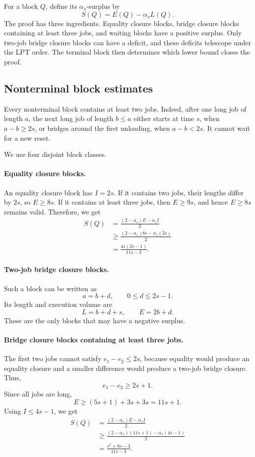 \documentclass[11pt]{article}
\begin{document}
For a block \(Q\), define its \(\alpha_s\)-surplus by
\[
S(Q)=E(Q)-\alpha_sL(Q).
\]
The proof has three ingredients. Equality closure blocks, bridge closure blocks
containing at least three jobs, and waiting blocks have a positive surplus. Only
two-job bridge closure blocks can have a deficit, and these deficits telescope
under the LPT order. The terminal block then determines which lower bound closes
the proof.

\subsection{Nonterminal block estimates}
\label{appsub:lpt-block-estimates}

Every nonterminal block contains at least two jobs. Indeed, after one long job
of length \(a\), the next long job of length \(b\le a\) either starts at time
\(s\), when \(a-b\ge2s\), or bridges around the first unloading, when
\(a-b<2s\). It cannot wait for a new reset.

We use four disjoint block classes.

\paragraph{Equality closure blocks.}
An equality closure block has \(I=2s\). If it contains two jobs, their lengths
differ by \(2s\), so \(E\ge8s\). If it contains at least three jobs, then
\(E\ge9s\), and hence \(E\ge8s\) remains valid. Therefore, we get 
\[
\begin{aligned}
S(Q)
&=\frac{(2-\alpha_s)E-\alpha_s I}{2}\\
&\ge
\frac{(2-\alpha_s)8s-\alpha_s(2s)}2\\
&=
\frac{4s(2s-1)}{11s-3}.
\end{aligned}
\tag{A.2}
\label{eq:lpt-equality-surplus}
\]

\paragraph{Two-job bridge closure blocks.}
Such a block can be written as
\[
a=b+d,
\qquad
0\le d\le2s-1.
\]
Its length and execution volume are
\[
L=b+d+s,
\qquad
E=2b+d.
\tag{A.3}
\label{eq:lpt-two-job-bridge}
\]
These are the only blocks that may have a negative surplus.

\paragraph{Bridge closure blocks containing at least three jobs.}
The first two jobs cannot satisfy \(e_1-e_2\le2s\), because equality would
produce an equality closure and a smaller difference would produce a two-job
bridge closure. Thus,
\[
e_1-e_2\ge2s+1.
\]
Since all jobs are long,
\[
E\ge(5s+1)+3s+3s=11s+1.
\]
Using \(I\le4s-1\), we get 
\[
\begin{aligned}
S(Q)
&=\frac{(2-\alpha_s)E-\alpha_s I}{2}\\
&\ge
\frac{(2-\alpha_s)(11s+1)-\alpha_s(4s-1)}2\\
&=
\frac{s^2+8s-3}{11s-3}.
\end{aligned}
\tag{A.4}
\label{eq:lpt-large-block-surplus}
\]
\end{document}
